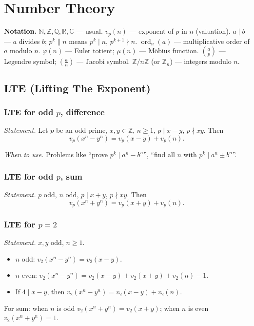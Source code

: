 \chapter{Number Theory}
\label{ch:numbers}

\medskip

\textbf{Notation.} $\mathbb{N},\mathbb{Z},\mathbb{Q},\mathbb{R},\mathbb{C}$ --- usual.
$v_p(n)$ --- exponent of $p$ in $n$ (valuation).
$a\mid b$ --- $a$ divides $b$; $p^k\parallel n$ means $p^k\mid n$, $p^{k+1}\nmid n$.
$\operatorname{ord}_n(a)$ --- multiplicative order of $a$ modulo $n$.
$\varphi(n)$ --- Euler totient; $\mu(n)$ --- M\"obius function.
$\left(\frac{a}{p}\right)$ --- Legendre symbol; $\left(\frac{a}{n}\right)$ --- Jacobi symbol.
$\mathbb{Z}/n\mathbb{Z}$ (or $\mathbb{Z}_n$) --- integers modulo $n$.

\medskip

\section{LTE (Lifting The Exponent)}

\subsection{LTE for odd $p$, difference}
\label{subsec:lte-odd-diff}

\textit{Statement.} Let $p$ be an odd prime, $x,y\in\mathbb{Z}$, $n\ge 1$, $p\mid x-y$, $p\nmid xy$. Then
$$v_p(x^n-y^n)=v_p(x-y)+v_p(n).$$

\textit{When to use.} Problems like ``prove $p^k\mid a^n-b^n$'', ``find all $n$ with $p^k\mid a^n\pm b^n$''.

\subsection{LTE for odd $p$, sum}
\label{subsec:lte-odd-sum}

\textit{Statement.} $p$ odd, $n$ odd, $p\mid x+y$, $p\nmid xy$. Then
$$v_p(x^n+y^n)=v_p(x+y)+v_p(n).$$

\subsection{LTE for $p=2$}
\label{subsec:lte-p2}

\textit{Statement.} $x,y$ odd, $n\ge 1$.
\begin{itemize}
\item $n$ odd: $v_2(x^n-y^n)=v_2(x-y)$.
\item $n$ even: $v_2(x^n-y^n)=v_2(x-y)+v_2(x+y)+v_2(n)-1$.
\item If $4\mid x-y$, then $v_2(x^n-y^n)=v_2(x-y)+v_2(n)$.
\end{itemize}
For sum: when $n$ is odd $v_2(x^n+y^n)=v_2(x+y)$; when $n$ is even $v_2(x^n+y^n)=1$.

